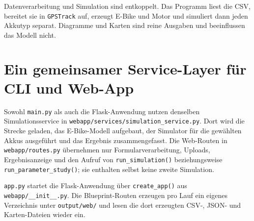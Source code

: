 Datenverarbeitung und Simulation sind entkoppelt. Das Programm liest die CSV, bereitet sie in \texttt{GPSTrack} auf, erzeugt E-Bike und Motor und simuliert dann jeden Akkutyp separat. Diagramme und Karten sind reine Ausgaben und beeinflussen das Modell nicht.

\section{Ein gemeinsamer Service-Layer für CLI und Web-App}

Sowohl \texttt{main.py} als auch die Flask-Anwendung nutzen denselben Simulationsservice in \texttt{webapp/services/simulation\_service.py}. Dort wird die Strecke geladen, das E-Bike-Modell aufgebaut, der Simulator für die gewählten Akkus ausgeführt und das Ergebnis zusammengefasst. Die Web-Routen in \texttt{webapp/routes.py} übernehmen nur Formularverarbeitung, Uploads, Ergebnisanzeige und den Aufruf von \texttt{run\_simulation()} beziehungsweise \texttt{run\_parameter\_study()}; sie enthalten selbst keine zweite Simulation.

\texttt{app.py} startet die Flask-Anwendung über \texttt{create\_app()} aus \texttt{webapp/\_\_init\_\_.py}. Die Blueprint-Routen erzeugen pro Lauf ein eigenes Verzeichnis unter \texttt{output/web/} und lesen die dort erzeugten CSV-, JSON- und Karten-Dateien wieder ein.
